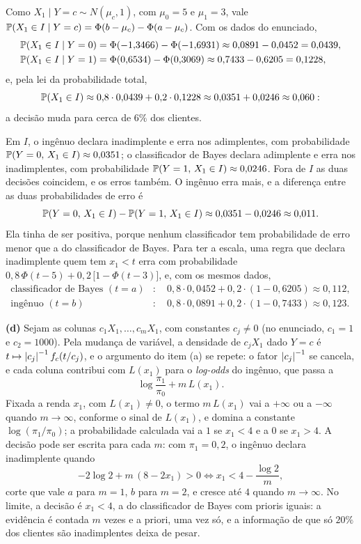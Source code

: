 \begin{solucao}
Como $X_1\mid Y=c\sim N(\mu_c,1)$, com $\mu_0=5$ e $\mu_1=3$, vale
$\mathbb{P}(X_1\in I\mid Y=c)=\Phi(b-\mu_c)-\Phi(a-\mu_c)$. Com os dados do enunciado,
\begin{align*}
  \mathbb{P}(X_1\in I\mid Y=0)&=\Phi(-1{,}3466)-\Phi(-1{,}6931)\approx0{,}0891-0{,}0452=0{,}0439,\\
  \mathbb{P}(X_1\in I\mid Y=1)&=\Phi(0{,}6534)-\Phi(0{,}3069)\approx0{,}7433-0{,}6205=0{,}1228,
\end{align*}
e, pela lei da probabilidade total,
\[
  \mathbb{P}(X_1\in I)\approx0{,}8\cdot0{,}0439+0{,}2\cdot0{,}1228\approx0{,}0351+0{,}0246\approx0{,}060 :
\]
a decisão muda para cerca de $6\%$ dos clientes.

Em $I$, o ingênuo declara inadimplente e erra nos adimplentes, com probabilidade
$\mathbb{P}(Y=0,\,X_1\in I)\approx0{,}0351$; o classificador de Bayes declara adimplente e erra nos
inadimplentes, com probabilidade $\mathbb{P}(Y=1,\,X_1\in I)\approx0{,}0246$. Fora de $I$ as duas
decisões coincidem, e os erros também. O ingênuo erra mais, e a diferença entre as duas
probabilidades de erro é
\[
  \mathbb{P}(Y=0,\,X_1\in I)-\mathbb{P}(Y=1,\,X_1\in I)\approx0{,}0351-0{,}0246\approx0{,}011 .
\]
Ela tinha de ser positiva, porque nenhum classificador tem probabilidade de erro menor que a do
classificador de Bayes. Para ter a escala, uma regra que declara inadimplente quem tem $x_1<t$
erra com probabilidade $0{,}8\,\Phi(t-5)+0{,}2\,\big[1-\Phi(t-3)\big]$, e, com os mesmos dados,
\begin{align*}
  \text{classificador de Bayes } (t=a)&:\quad 0{,}8\cdot0{,}0452+0{,}2\cdot(1-0{,}6205)\approx0{,}112,\\
  \text{ingênuo } (t=b)&:\quad 0{,}8\cdot0{,}0891+0{,}2\cdot(1-0{,}7433)\approx0{,}123 .
\end{align*}

\smallskip
\textbf{(d)} Sejam as colunas $c_1X_1,\dots,c_mX_1$, com constantes $c_j\ne0$ (no enunciado,
$c_1=1$ e $c_2=1000$). Pela mudança de variável, a densidade de $c_jX_1$ dado $Y=c$ é
$t\mapsto\left\lvert c_j \right\rvert^{-1}f_c(t/c_j)$, e o argumento do item (a) se repete: o fator
$\left\lvert c_j \right\rvert^{-1}$ se cancela, e cada coluna contribui com $L(x_1)$ para o \emph{log-odds} do
ingênuo, que passa a
\[
  \log\frac{\pi_1}{\pi_0}+m\,L(x_1).
\]
Fixada a renda $x_1$, com $L(x_1)\ne0$, o termo $m\,L(x_1)$ vai a $+\infty$ ou a $-\infty$
quando $m\to\infty$, conforme o sinal de $L(x_1)$, e domina a constante $\log(\pi_1/\pi_0)$; a
probabilidade calculada vai a $1$ se $x_1<4$ e a $0$ se $x_1>4$. A decisão pode ser escrita
para cada $m$: com $\pi_1=0{,}2$, o ingênuo declara inadimplente quando
\[
  -2\log2+m\,(8-2x_1)>0\iff x_1<4-\frac{\log2}{m},
\]
corte que vale $a$ para $m=1$, $b$ para $m=2$, e cresce até $4$ quando $m\to\infty$. No limite,
a decisão é $x_1<4$, a do classificador de Bayes com prioris iguais: a evidência é contada $m$
vezes e a priori, uma vez só, e a informação de que só $20\%$ dos clientes são inadimplentes
deixa de pesar.


\end{solucao}
